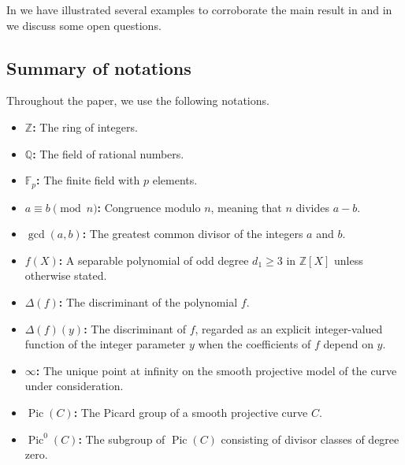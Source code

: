 \documentclass[12pt, reqno]{amsart}
\DeclareMathOperator{\Pic}{Pic}
\numberwithin{equation}{section}
\theoremstyle{definition}
\theoremstyle{nodefstyle}
\begin{document}
In  we have illustrated several examples to corroborate the main result in  and in  we discuss some open questions.


\subsection{Summary of notations}\label{sec:notation}

Throughout the paper, we use the following notations.

\begin{itemize}

  \item \textbf{$\mathbb{Z}$:}
  The ring of integers.
  
  \item \textbf{$\mathbb{Q}$:}
  The field of rational numbers.
  
  \item \textbf{$\mathbb{F}_p$:}
  The finite field with $p$
  elements.

  \item \textbf{$a \equiv b \pmod{n}$:}
  Congruence modulo $n$, meaning that $n$ divides $a-b$.

  \item \textbf{$\gcd(a,b)$:}
  The greatest common divisor of the integers $a$ and $b$.

  \item \textbf{$f(X)$:}
  A separable polynomial of odd degree $d_1 \ge 3$ in $\mathbb{Z}[X]$ unless otherwise stated.

  \item \textbf{$\Delta(f)$:}
  The discriminant of the polynomial $f$.

  \item \textbf{$\Delta(f)(y)$:}
  The discriminant of $f$, regarded as an explicit integer-valued function of the integer
  parameter $y$ when the coefficients of $f$ depend on $y$.


  \item \textbf{$\infty$:}
  The unique point at infinity on the smooth projective model of the curve under
  consideration.


  \item \textbf{$\Pic(C)$:}
  The Picard group of a smooth projective curve $C$.

  \item \textbf{$\Pic^0(C)$:}
  The subgroup of $\Pic(C)$ consisting of divisor classes of degree zero.


\end{itemize}
\end{document}
